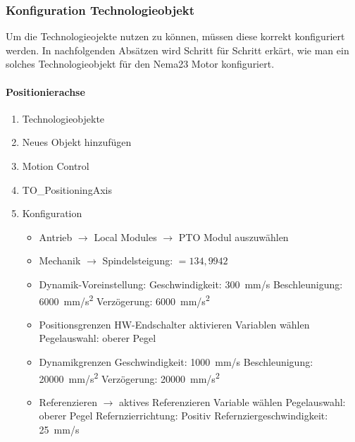 \subsubsection{Konfiguration Technologieobjekt}
Um die Technologieojekte nutzen zu können, müssen diese korrekt konfiguriert werden. In nachfolgenden Absätzen wird Schritt für Schritt erkärt, wie man ein solches Technologieobjekt für den Nema23 Motor konfiguriert. 

\paragraph{Positionierachse}
    
        \begin{enumerate}
            \item Technologieobjekte
            \item Neues Objekt hinzufügen
            \item Motion Control
            \item TO\_PositioningAxis
            \item Konfiguration
            
                \begin{itemize}

                \item Antrieb $\rightarrow$ Local Modules $\rightarrow$ PTO Modul auszuwählen
                \item Mechanik $\rightarrow$ Spindelsteigung: $= 134,9942$
                \item Dynamik-Voreinstellung: 
                    \subitem Geschwindigkeit:
                        \qty{300}{\milli\meter/\second}
                    \subitem Beschleunigung: 
                        \qty{6000}{\milli\meter/\square\second}
                    \subitem Verzögerung:
                        \qty{6000}{\milli\meter/\square\second}
                \item Positionsgrenzen
                    \subitem HW-Endschalter aktivieren
                    \subitem Variablen wählen
                    \subitem Pegelauswahl: oberer Pegel
                \item Dynamikgrenzen
                    \subitem Geschwindigkeit:
                        \qty{1000}{\milli\meter/\second}
                    \subitem Beschleunigung: 
                        \qty{20000}{\milli\meter/\square\second}
                    \subitem Verzögerung:
                        \qty{20000}{\milli\meter/\square\second}
                \item Referenzieren $\rightarrow$ aktives Referenzieren
                    \subitem Variable wählen
                    \subitem Pegelauswahl: oberer Pegel
                    \subitem Refernzierrichtung: Positiv
                    \subitem Refernziergeschwindigkeit:
                        \qty{25}{\milli\meter/\second}
                
                \end{itemize}
        \end{enumerate}

